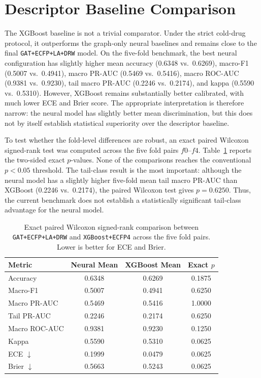 \section{Descriptor Baseline Comparison}
The XGBoost baseline is not a trivial comparator. Under the strict cold-drug protocol, it outperforms the graph-only neural baselines and remains close to the final \texttt{GAT+ECFP+LA+DRW} model. On the five-fold benchmark, the best neural configuration has slightly higher mean accuracy (0.6348 vs.\ 0.6269), macro-F1 (0.5007 vs.\ 0.4941), macro PR-AUC (0.5469 vs.\ 0.5416), macro ROC-AUC (0.9381 vs.\ 0.9230), tail macro PR-AUC (0.2246 vs.\ 0.2174), and kappa (0.5590 vs.\ 0.5310). However, XGBoost remains substantially better calibrated, with much lower ECE and Brier score. The appropriate interpretation is therefore narrow: the neural model has slightly better mean discrimination, but this does not by itself establish statistical superiority over the descriptor baseline.

To test whether the fold-level differences are robust, an exact paired Wilcoxon signed-rank test was computed across the five fold pairs \(f0\)--\(f4\). Table~\ref{tab:wilcoxon_xgb} reports the two-sided exact \(p\)-values. None of the comparisons reaches the conventional \(p<0.05\) threshold. The tail-class result is the most important: although the neural model has a slightly higher five-fold mean tail macro PR-AUC than XGBoost (0.2246 vs.\ 0.2174), the paired Wilcoxon test gives \(p=0.6250\). Thus, the current benchmark does not establish a statistically significant tail-class advantage for the neural model.

\begin{table}[H]
\centering
\caption{Exact paired Wilcoxon signed-rank comparison between \texttt{GAT+ECFP+LA+DRW} and \texttt{XGBoost+ECFP4} across the five fold pairs. Lower is better for ECE and Brier.}
\label{tab:wilcoxon_xgb}
\begin{tabular}{lccc}
\toprule
Metric & Neural Mean & XGBoost Mean & Exact \(p\) \\
\midrule
Accuracy & 0.6348 & 0.6269 & 0.1875 \\
Macro-F1 & 0.5007 & 0.4941 & 0.6250 \\
Macro PR-AUC & 0.5469 & 0.5416 & 1.0000 \\
Tail PR-AUC & 0.2246 & 0.2174 & 0.6250 \\
Macro ROC-AUC & 0.9381 & 0.9230 & 0.1250 \\
Kappa & 0.5590 & 0.5310 & 0.0625 \\
ECE \(\downarrow\) & 0.1999 & 0.0479 & 0.0625 \\
Brier \(\downarrow\) & 0.5663 & 0.5243 & 0.0625 \\
\bottomrule
\end{tabular}
\end{table}


